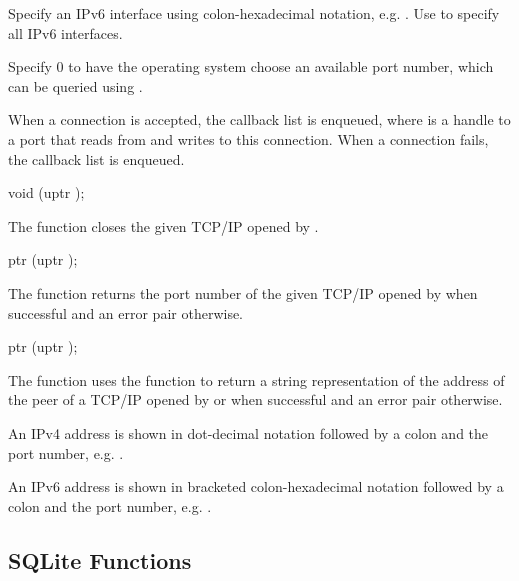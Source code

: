 Specify an IPv6 interface  using colon-hexadecimal
notation, e.g. . Use \code{::} to specify all IPv6
interfaces.

Specify  0 to have the operating system choose an available
port number, which can be queried using
.

When a connection is accepted, the callback list
 is enqueued, where  is a
handle to a port that reads from and writes to this connection. When a
connection fails, the callback list  is enqueued.

\begin{function}
  void (uptr );
\end{function}

The  function closes the given TCP/IP
 opened by .

\begin{function}
  ptr (uptr );
\end{function}

The  function returns the port
number of the given TCP/IP  opened by
 when successful and an error pair otherwise.

\begin{function}
  ptr (uptr );
\end{function}

The  function uses the
 function to return a string representation
of the address of the peer of a TCP/IP  opened by
 or  when successful
and an error pair otherwise.

An IPv4 address is shown in dot-decimal notation followed by a colon
and the port number, e.g. .

An IPv6 address is shown in bracketed colon-hexadecimal notation
followed by a colon and the port number, e.g. .

\subsection {SQLite Functions}

